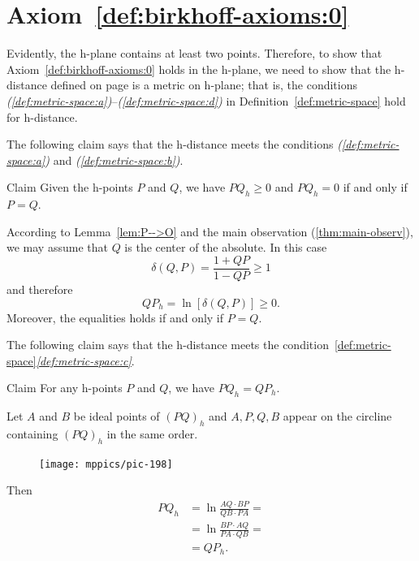 \section*{Axiom~\ref{def:birkhoff-axioms:0}}

Evidently, the h-plane contains at least two points.
Therefore, to show that Axiom~\ref{def:birkhoff-axioms:0} holds in the h-plane, we need to show that the h-distance defined on page \pageref{h-dist} is a metric on h-plane;
that is, the conditions \textit{(\ref{def:metric-space:a})}--\textit{(\ref{def:metric-space:d})} 
in Definition~\ref{def:metric-space} hold for h-distance.


The following claim says that the h-distance meets the conditions \textit{(\ref{def:metric-space:a})} 
and \textit{(\ref{def:metric-space:b})}.

\begin{thm}{Claim}
Given the h-points $P$ and $Q$, we have
$PQ_h\ge 0$
and $PQ_h=0$ if and only if $P=Q$.
\end{thm}


According to Lemma~\ref{lem:P-->O}
and the main observation (\ref{thm:main-observ}), 
we may assume that $Q$ is the center of the absolute.
In this case
$$
\delta(Q,P)=\frac{1+QP}{1-QP}\ge 1$$
and therefore
$$QP_h=\ln[\delta(Q,P)]\ge 0.$$
Moreover, the equalities holds if and only if $P=Q$.
\qeds

The following claim says that the h-distance meets the condition~\ref{def:metric-space}\textit{\ref{def:metric-space:c}}.

\begin{thm}{Claim}
For any h-points $P$ and $Q$, we have
$PQ_h=QP_h$.
\end{thm}

Let $A$ and $B$ be ideal points of $(PQ)_h$ and
$A,P,Q,B$ appear on the circline containing $(PQ)_h$ in the same order.

{

\begin{figure}
\vskip-5mm
\centering
\texttt{[image: mppics/pic-198]}
\end{figure}

Then
\begin{align*}
PQ_h
&=\ln\frac{AQ\cdot BP}{QB\cdot PA}
=
\\
&=\ln\frac{BP\cdot AQ}{PA\cdot QB}=
\\
&=QP_h.
\end{align*}
\qedsf

}

